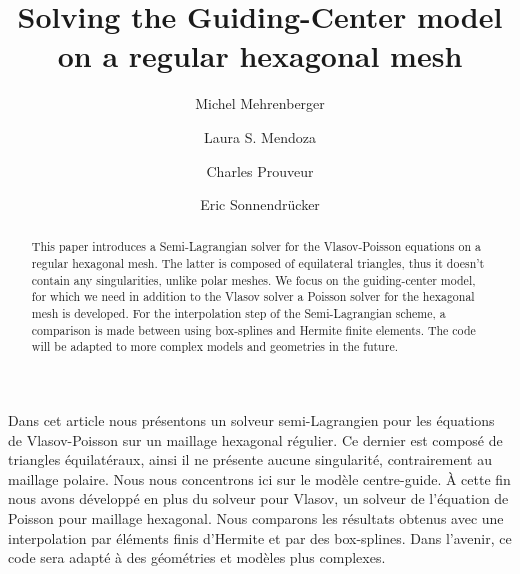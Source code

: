\documentclass[proc]{edpsmath}
\begin{document}

\title{Solving the Guiding-Center model\\on a regular hexagonal mesh}%
%
\author{Michel Mehrenberger} \address{IRMA, Universit\'e de Strasbourg, 7, rue Ren\'e Descartes, 67084 Strasbourg \& INRIA-Nancy Grand-Est, projet TONUS, 
}
\author{Laura S. Mendoza} \address{Max-Planck-Institut f\"{u}r Plasmaphysik, Boltzmannstr. 2, D-85748 Garching, Germany. } 
\author{Charles Prouveur}\address{Universit\'e de Lyon, UMR5208, Institut Camille Jordan,
43 boulevard 11 novembre 1918, F-69622 Villeurbanne cedex, France.  }
\author{Eric Sonnendr\"{u}cker}
%
%


\begin{abstract} 
This paper introduces a Semi-Lagrangian solver for the Vlasov-Poisson equations on a regular hexagonal mesh. The latter is composed of equilateral triangles, thus it doesn't contain any singularities, unlike polar meshes. We focus on the guiding-center model, for which we need in addition to the Vlasov solver a Poisson solver for the hexagonal mesh is developed. For the interpolation step of the Semi-Lagrangian scheme, a comparison is made between using box-splines and Hermite finite elements. The code will be adapted  to more complex models and geometries in the future.
\end{abstract}

\begin{resume} 
Dans cet article nous présentons un solveur semi-Lagrangien pour les \'equations de Vlasov-Poisson sur un maillage hexagonal r\'egulier. Ce dernier est compos\'e de triangles \'equilat\'eraux, ainsi il ne pr\'esente aucune singularit\'e, contrairement au maillage polaire. Nous nous concentrons ici sur le mod\`ele centre-guide. \`A cette fin nous avons d\'evelopp\'e en plus du solveur pour Vlasov, un solveur de l'\'equation de Poisson pour maillage hexagonal. Nous comparons les r\'esultats obtenus avec une interpolation par  \'el\'ements finis d'Hermite et par des box-splines.   Dans l'avenir, ce code sera adapt\'e \`a des g\'eom\'etries et mod\`eles plus complexes.  
\end{resume}
\end{document}
